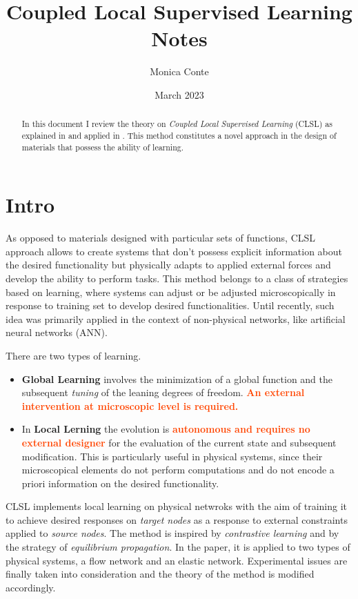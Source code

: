 \documentclass[11pt]{article}
\title{Coupled Local Supervised Learning Notes}
\author{Monica Conte}
\date{March 2023}
\newcommand{\important}[1]{\textcolor{OrangeRed}{\bf{#1}}}
\begin{document}
\captionsetup{width=0.85\textwidth}

\maketitle

\renewcommand{\abstractname}{}
\begin{abstract}
    In this document I review the theory on \textit{Coupled Local Supervised Learning} (CLSL) as explained in \cite{Stern} and applied in \cite{Dillavou}. This method constitutes a novel approach in the design of materials that possess the ability of learning.

\end{abstract}

\tableofcontents


\newpage

\section{Intro}

As opposed to materials designed with particular sets of functions, CLSL approach allows to create systems that don't possess explicit information about the desired functionality but physically adapts to applied external forces and develop the ability to perform tasks. This method belongs to a class of strategies based on learning, where systems can adjust or be adjusted microscopically in response to training set to develop desired functionalities. Until recently, such idea was primarily applied in the context of non-physical networks, like artificial neural networks (ANN).

There are two types of learning. 
\begin{itemize}
\item \textbf{Global Learning} involves the minimization of a global function and the subsequent \textit{tuning} of the leaning degrees of freedom. \important{An external intervention at microscopic level is required.} 
\item In \textbf{Local Lerning} the evolution is \important{autonomous and requires no external designer} for the evaluation of the current state and subsequent modification. This is particularly useful in physical systems, since their microscopical elements do not perform computations and do not encode a priori information on the desired functionality. 
\end{itemize}

CLSL implements local learning on physical netwroks with the aim of training it to achieve desired responses on \textit{target nodes} as a response to external constraints applied to \textit{source nodes}. The method is inspired by \textit{contrastive learning} and by the strategy of \textit{equilibrium propagation}. In the paper, it is applied to two types of physical systems, a flow network and an elastic network. Experimental issues are finally taken into consideration and the theory of the method is modified accordingly. 
\end{document}
